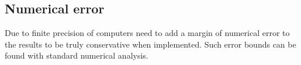 \subsection{Numerical error}
Due to finite precision of computers need to add a margin of numerical error to the results to be truly conservative when implemented. Such error bounds can be found with standard numerical analysis.
%
%
%
%
%
%
%
%
